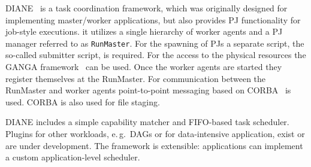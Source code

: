\documentclass[conference]{IEEEtran}
\begin{document}

DIANE~\cite{Moscicki:908910} is a task coordination framework, which
was originally designed for implementing master/worker applications,
but also provides PJ functionality for job-style executions. it
utilizes a single hierarchy of worker agents and a PJ manager
referred to as \texttt{RunMaster}.
For the spawning of PJs a separate script, the so-called submitter script, is
required. For the access to the physical resources the GANGA
framework~\cite{Moscicki20092303} can be used.
Once the worker agents are started they register themselves at the RunMaster.
For communication between the RunMaster and worker agents point-to-point
messaging based on CORBA~\cite{OMG-CORBA303:2004} is used. CORBA is also used
for file staging.


DIANE includes a simple capability matcher and FIFO-based task scheduler.
Plugins for other workloads, e.\,g.\ DAGs or for data-intensive
application, exist or are under development. The framework is extensible:
applications can implement a custom application-level scheduler.


\end{document}
